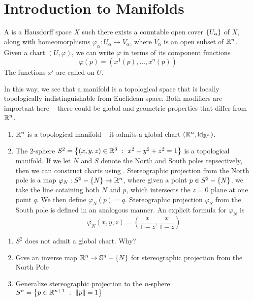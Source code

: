 \section{Introduction to Manifolds}
%
\begin{defn}
A  is a Hausdorff space $X$ such there exists a countable open cover $\left\lbrace U_\alpha \right\rbrace$
of $X$, along with homeomorphisms $\varphi_\alpha : U_\alpha \to V_\alpha$, where $V_\alpha$ is an open subset
of $\mathbb{R}^n$. Given a chart $(U, \varphi)$, we can write $\varphi$ in terms of its component functions
$$\varphi(p) = (x^1(p), \ldots, x^n(p)) $$
The functions $x^i$ are called  on $U$.
\end{defn}
%
In this way, we see that a manifold is a topological space that is locally topologically indistinguishable from
Euclidean space. Both modifiers are important here -- there could be global and geometric properties that
differ from $\mathbb{R}^n$.
%
\begin{exmp}\enumbreak
	\begin{enumerate}
		\item $\mathbb{R}^n$ is a topological manifold -- it admits a global chart $(\mathbb{R}^n, \operatorname{id}_{\mathbb{R}^n})$.
		\item The $2$-sphere $S^2 = \left\lbrace (x,y,z) \in \mathbb{R}^3 ~:~ x^2 + y^2 + z^2 = 1 \right\rbrace$ is a topological
		manifold. If we let $N$ and $S$ denote the North and South poles repsectively, then we can
		construct charts using . Stereographic projection from the North
		pole is a map $\varphi_N : S^2 - \left\lbrace N \right\rbrace \to \mathbb{R}^n$, where given a point $p \in S^2 - \left\lbrace N \right\rbrace$,
		we take the line cotaining both $N$ and $p$, which intersects the $z = 0 $ plane at one point
		$q$. We then define $\varphi_N(p) = q$. Stereographic projection $\varphi_S$ from the South
		pole is defined in an analogous manner. An explicit formula for $\varphi_N$ is
		$$\varphi_N(x,y,z) = \left(\frac{x}{1 - z}, \frac{x}{1 - z} \right) $$
	\end{enumerate}
\end{exmp}
%
\begin{exer}\enumbreak
	\begin{enumerate}
		\item $S^2$ does not admit a global chart. Why?
		\item Give an inverse map $\mathbb{R}^n \to \mathbb{S}^n - \left\lbrace N \right\rbrace$ for stereographic projection from the
			North Pole
		\item Generalize stereographic projection to the $n$-sphere
		$S^n = \left\lbrace p \in \mathbb{R}^{n+1} ~:~ \left\lVert p\right\rVert = 1 \right\rbrace$
	\end{enumerate}
\end{exer}
